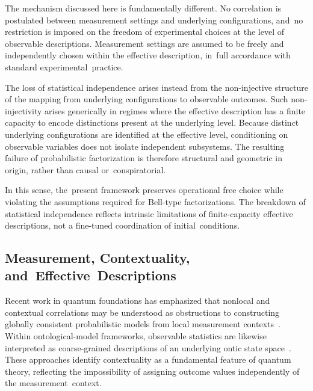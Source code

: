 \documentclass[quantumrep,article,accept,pdftex,oneauthor]{Definitions/mdpi}
\theoremstyle{remark}
\begin{document}
    The mechanism discussed here is fundamentally different.
    No correlation is postulated between measurement settings and underlying
    configurations, and~no restriction is imposed on the freedom of experimental choices
    at the level of observable descriptions.
    Measurement settings are assumed to be freely and independently chosen within the
    effective description, in~full accordance with standard experimental~practice.

    The loss of statistical independence arises instead from the non-injective structure
    of the mapping from underlying configurations to observable outcomes.
    Such non-injectivity arises generically in regimes where the effective description
    has a finite capacity to encode distinctions present at the underlying level.
    Because distinct underlying configurations are identified at the effective level,
    conditioning on observable variables does not isolate independent subsystems.
    The resulting failure of probabilistic factorization is therefore structural and
    geometric in origin, rather than causal or~conspiratorial.

    In this sense, the~present framework preserves operational free choice while violating
    the assumptions required for Bell-type factorizations.
    The breakdown of statistical independence reflects intrinsic limitations of
    finite-capacity effective descriptions, not a fine-tuned coordination of initial~conditions.

  \subsection{Measurement, Contextuality, and~Effective~Descriptions}
    \label{subsec:contextuality}

    Recent work in quantum foundations has emphasized that nonlocal and contextual
    correlations may be understood as obstructions to constructing globally consistent
    probabilistic models from local measurement contexts~\cite{AbramskyBrandenburger2011}.
    Within ontological-model frameworks, observable statistics are likewise interpreted
    as coarse-grained descriptions of an underlying ontic state space~\cite{Spekkens2007Epistemic}.
    These approaches identify contextuality as a fundamental feature of quantum theory,
    reflecting the impossibility of assigning outcome values independently of the
    measurement~context.
\end{document}
